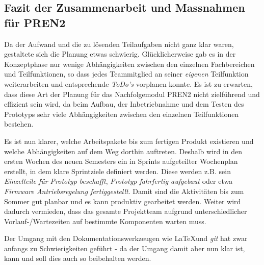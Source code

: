 \documentclass[main.tex]{subfiles} %
\begin{document}
\subsection*{Fazit der Zusammenarbeit und Massnahmen für PREN2}
Da der Aufwand und die zu lösenden Teilaufgaben nicht ganz klar waren,
gestaltete sich die Planung etwas schwierig. Glücklicherweise gab es in der
Konzeptphase nur wenige Abhängigkeiten zwischen den einzelnen Fachbereichen und
Teilfunktionen, so dass jedes Teammitglied an seiner \textit{eigenen}
Teilfunktion weiterarbeiten und entsprechende \textit{ToDo's} vorplanen konnte.
Es ist zu erwarten, dass diese Art der Planung für das Nachfolgemodul PREN2
nicht zielführend und effizient sein wird, da beim Aufbau, der Inbetriebnahme
und dem Testen des Prototyps sehr viele Abhängigkeiten zwischen den einzelnen
Teilfunktionen bestehen.

Es ist nun klarer, welche Arbeitspakete bis zum fertigen Produkt existieren und
welche Abhängigkeiten auf dem Weg dorthin auftreten. Deshalb wird in den ersten
Wochen des neuen Semesters ein in Sprints aufgeteilter Wochenplan erstellt, in
dem klare Sprintziele definiert werden. Diese werden z.B. sein
\textit{Einzelteile für Prototyp beschafft}, \textit{Prototyp fahrfertig
    aufgebaut} oder etwa \textit{Firmware Antriebsregelung
    fertiggestellt}. Damit sind die Aktivitäten bis zum Sommer gut planbar und es
kann produktiv gearbeitet werden. Weiter wird dadurch vermieden, dass das
gesamte Projektteam aufgrund unterschiedlicher Vorlauf-/Wartezeiten auf
bestimmte Komponenten warten muss.

Der Umgang mit den Dokumentationswerkzeugen wie \LaTeX und \textit{git} hat
zwar anfangs zu Schwierigkeiten geführt - da der Umgang damit aber nun klar
ist, kann und soll dies auch so beibehalten werden.
\end{document}
